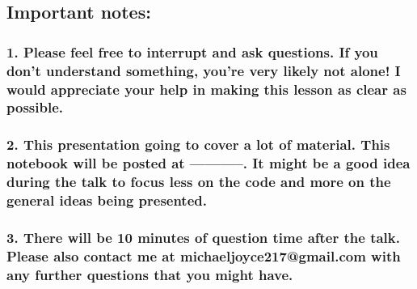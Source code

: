 \documentclass[11pt]{article}
\begin{document}
    \hypertarget{important-notes}{%
\subsection{Important notes:}\label{important-notes}}

\hypertarget{please-feel-free-to-interrupt-and-ask-questions.-if-you-dont-understand-something-youre-very-likely-not-alone-i-would-appreciate-your-help-in-making-this-lesson-as-clear-as-possible.}{%
\subsubsection{1. Please feel free to interrupt and ask questions. If
you don't understand something, you're very likely not alone! I would
appreciate your help in making this lesson as clear as
possible.}\label{please-feel-free-to-interrupt-and-ask-questions.-if-you-dont-understand-something-youre-very-likely-not-alone-i-would-appreciate-your-help-in-making-this-lesson-as-clear-as-possible.}}

\hypertarget{this-presentation-going-to-cover-a-lot-of-material.-this-notebook-will-be-posted-at-.-it-might-be-a-good-idea-during-the-talk-to-focus-less-on-the-code-and-more-on-the-general-ideas-being-presented.}{%
\subsubsection{2. This presentation going to cover a lot of material.
This notebook will be posted at -----------. It might be a good idea
during the talk to focus less on the code and more on the general ideas
being
presented.}\label{this-presentation-going-to-cover-a-lot-of-material.-this-notebook-will-be-posted-at-.-it-might-be-a-good-idea-during-the-talk-to-focus-less-on-the-code-and-more-on-the-general-ideas-being-presented.}}

\hypertarget{there-will-be-10-minutes-of-question-time-after-the-talk.-please-also-contact-me-at-michaeljoyce217gmail.com-with-any-further-questions-that-you-might-have.}{%
\subsubsection{3. There will be 10 minutes of question time after the
talk. Please also contact me at michaeljoyce217@gmail.com with any
further questions that you might
have.}\label{there-will-be-10-minutes-of-question-time-after-the-talk.-please-also-contact-me-at-michaeljoyce217gmail.com-with-any-further-questions-that-you-might-have.}}
\end{document}
